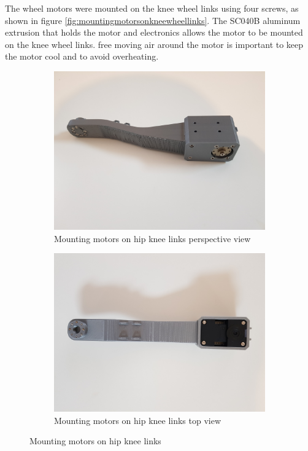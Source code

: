 The wheel motors were mounted on the knee wheel links using four screws, as shown in figure \ref{fig:mountingmotorsonkneewheellinks}. The SC040B aluminum extrusion that holds the motor and electronics allows the motor to be mounted on the knee wheel links. free moving air around the motor is important to keep the motor cool and to avoid overheating.
\begin{figure}[h]
	\centering
	\begin{subfigure}[t]{0.45\textwidth}
		\includegraphics[height=0.7\textwidth]{mounting_motors_on_hip_knee_links_1}
		\caption{Mounting motors on hip knee links perspective view}
		\label{fig:mountingmotorsonhipkneelinksperspectiveview}
	\end{subfigure}
	\begin{subfigure}[t]{0.45\textwidth}
		\includegraphics[height=0.7\textwidth]{mounting_motors_on_hip_knee_links_2}
		\caption{Mounting motors on hip knee links top view}
		\label{fig:mountingmotorsonhipkneelinkstopview}
	\end{subfigure}
	\caption{Mounting motors on hip knee links}
	\label{fig:Mounting motors on hip knee links}
\end{figure}

